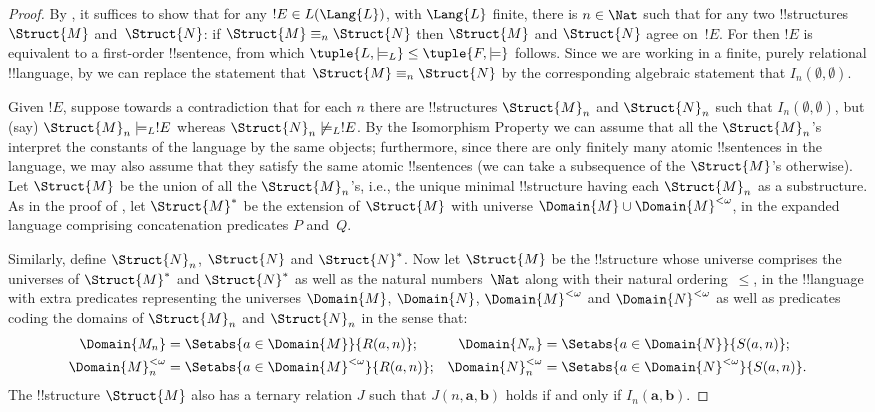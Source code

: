 \documentclass[../../include/open-logic-section]{subfiles}
\begin{document}
\begin{proof}
By , it suffices to show that for any $!E
\in L(\Lang{L})$, with $\Lang{L}$ finite, there is $n \in \Nat$
such that for any two !!{structure}s $\Struct{M}$ and~$\Struct{N}$: if
$\Struct{M} \equiv_n \Struct{N}$ then $\Struct{M}$ and $\Struct{N}$
agree on~$!E$. For then $!E$ is equivalent to a first-order
!!{sentence}, from which $\tuple{L, \models_L} \le \tuple{F, \models}$
follows. Since we are working in a finite, purely relational
!!{language}, by  we can replace the statement
that $\Struct{M} \equiv_n \Struct{N}$ by the corresponding algebraic
statement that $I_n(\emptyset,\emptyset)$.

Given $!E$, suppose towards a contradiction that for each $n$
there are !!{structure}s $\Struct{M}_n$ and $\Struct{N}_n$ such that
$I_n(\emptyset, \emptyset)$, but (say) $\Struct{M}_n \models_L
!E$ whereas $\Struct{N}_n \not\models_L !E$. By the
Isomorphism Property we can assume that all the $\Struct{M}_n$'s
interpret the constants of the language by the same objects;
furthermore, since there are only finitely many atomic !!{sentence}s in
the language, we may also assume that they satisfy the same atomic
!!{sentence}s (we can take a subsequence of the $\Struct{M}$'s
otherwise). Let $\Struct{M}$ be the union of all the $\Struct{M}_n$'s,
i.e., the unique minimal !!{structure} having each $\Struct{M}_n$ as a
substructure.  As in the proof of , let
$\Struct{M}^*$ be the extension of $\Struct{M}$ with universe $\Domain{M} \cup
\Domain{M}^{<\omega}$, in the expanded language comprising concatenation
predicates $P$ and~$Q$.

Similarly, define $\Struct{N}_n$, $\Struct{N}$ and $\Struct{N}^*$. Now
let $\Struct{M}$ be the !!{structure} whose universe comprises the
universes of $\Struct{M}^*$ and $\Struct{N}^*$ as well as the natural
numbers~$\Nat$ along with their natural ordering~$\le$, in the
!!{language} with extra predicates representing the universes
$\Domain{M}$, $\Domain{N}$, $\Domain{M}^{<\omega}$ and
$\Domain{N}^{<\omega}$ as well as predicates coding the domains of
$\Struct{M}_n$ and $\Struct{N}_n$ in the sense that:
\begin{align*}
  \Domain{M_n} & = \Setabs{a \in \Domain{M}}{R(a, n)}; & 
  \Domain{N_n} & = \Setabs{a \in \Domain{N}}{S(a,n)}; \\
  \Domain{M}^{<\omega}_n & = \Setabs{a \in \Domain{M}^{<\omega}}{R(a,n)}; &
  \Domain{N}^{<\omega}_n & = \Setabs{a \in \Domain{N}^{<\omega}}{S(a,n)}. 
\end{align*}
The !!{structure} $\Struct{M}$ also has a ternary relation $J$ such
that $J(n, \mathbf{a}, \mathbf{b})$ holds if and only if
$I_n(\mathbf{a}, \mathbf{b})$.


\end{proof}
\end{document}
